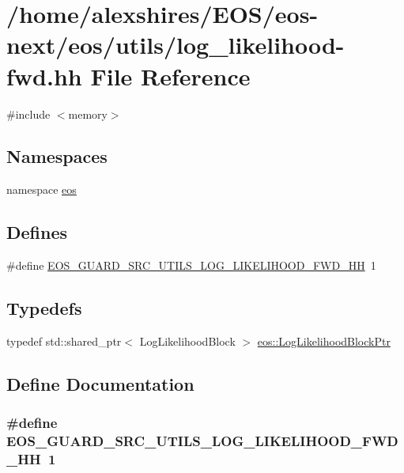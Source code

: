 \hypertarget{log__likelihood-fwd_8hh}{
\section{/home/alexshires/EOS/eos-\/next/eos/utils/log\_\-likelihood-\/fwd.hh File Reference}
\label{log__likelihood-fwd_8hh}
}
{\ttfamily \#include $<$memory$>$}\par
\subsection*{Namespaces}
\begin{DoxyCompactItemize}
\item 
namespace \hyperlink{namespaceeos}{eos}
\end{DoxyCompactItemize}
\subsection*{Defines}
\begin{DoxyCompactItemize}
\item 
\#define \hyperlink{log__likelihood-fwd_8hh_a6d7160af9fc02d37e751270f6e914bec}{EOS\_\-GUARD\_\-SRC\_\-UTILS\_\-LOG\_\-LIKELIHOOD\_\-FWD\_\-HH}~1
\end{DoxyCompactItemize}
\subsection*{Typedefs}
\begin{DoxyCompactItemize}
\item 
typedef std::shared\_\-ptr$<$ LogLikelihoodBlock $>$ \hyperlink{namespaceeos_ab823a6782e060c440e05a614158ad1bf}{eos::LogLikelihoodBlockPtr}
\end{DoxyCompactItemize}


\subsection{Define Documentation}
\hypertarget{log__likelihood-fwd_8hh_a6d7160af9fc02d37e751270f6e914bec}{
\subsubsection[{EOS\_\-GUARD\_\-SRC\_\-UTILS\_\-LOG\_\-LIKELIHOOD\_\-FWD\_\-HH}]{\setlength{\rightskip}{0pt plus 5cm}\#define EOS\_\-GUARD\_\-SRC\_\-UTILS\_\-LOG\_\-LIKELIHOOD\_\-FWD\_\-HH~1}}
\label{log__likelihood-fwd_8hh_a6d7160af9fc02d37e751270f6e914bec}
